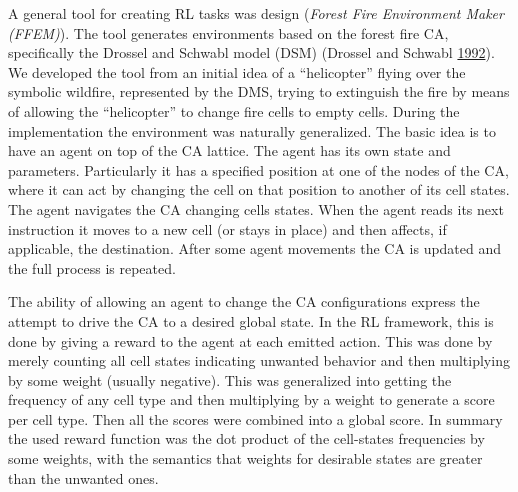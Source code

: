 \documentclass[
  12pt,
  openany]{book}
\begin{document}
A general tool for creating RL tasks was design (\emph{Forest Fire Environment Maker (FFEM)}). The tool generates environments based on the forest fire CA, specifically the Drossel and Schwabl model (DSM) (Drossel and Schwabl \protect\hyperlink{ref-drossel1992self}{1992}). We developed the tool from an initial idea of a ``helicopter'' flying over the symbolic wildfire, represented by the DMS, trying to extinguish the fire by means of allowing the ``helicopter'' to change fire cells to empty cells. During the implementation the environment was naturally generalized. The basic idea is to have an agent on top of the CA lattice. The agent has its own state and parameters. Particularly it has a specified position at one of the nodes of the CA, where it can act by changing the cell on that position to another of its cell states. The agent navigates the CA changing cells states. When the agent reads its next instruction it moves to a new cell (or stays in place) and then affects, if applicable, the destination. After some agent movements the CA is updated and the full process is repeated.

The ability of allowing an agent to change the CA configurations express the attempt to drive the CA to a desired global state. In the RL framework, this is done by giving a reward to the agent at each emitted action. This was done by merely counting all cell states indicating unwanted behavior and then multiplying by some weight (usually negative). This was generalized into getting the frequency of any cell type and then multiplying by a weight to generate a score per cell type. Then all the scores were combined into a global score. In summary the used reward function was the dot product of the cell-states frequencies by some weights, with the semantics that weights for desirable states are greater than the unwanted ones.
\end{document}
